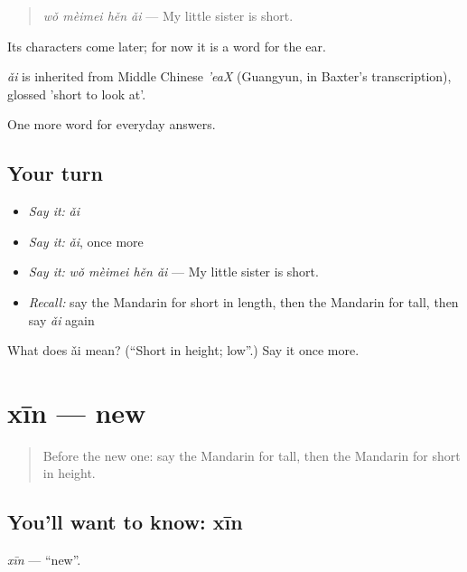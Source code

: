 \begin{quote}
\emph{wǒ mèimei hěn ǎi} — My little sister is short.
\end{quote}

Its characters come later; for now it is a word for the ear.

\begin{cousinweb}
\emph{ǎi} is inherited from Middle Chinese \emph{'eaX} (Guangyun, in Baxter's transcription), glossed 'short to look at'.
\end{cousinweb}

\begin{grammarlens}[title={What you've built}]
One more word for everyday answers.
\end{grammarlens}

\subsection*{Your turn}
\begin{itemize}
\raggedright
  \item \emph{Say it:} \emph{ǎi}
  \item \emph{Say it:} \emph{ǎi}, once more
  \item \emph{Say it:} \emph{wǒ mèimei hěn ǎi} — My little sister is short.
  \item \emph{Recall:} say the Mandarin for short in length, then the Mandarin for tall, then say \emph{ǎi} again
\end{itemize}

\begin{tcolorbox}[breakable,colback=teal!4,colframe=teal!35!black,title={Before you move on}]
What does ǎi mean? (\textquotedblleft{}Short in height; low\textquotedblright{}.) Say it once more.
\end{tcolorbox}
\section[xīn]{xīn — new}

\label{lesson:ZH-C61-xin}



\begin{quote}
Before the new one: say the Mandarin for tall, then the Mandarin for short in height.
\end{quote}

\subsection*{You'll want to know: xīn}
\emph{xīn} — \textquotedblleft{}new\textquotedblright{}.

